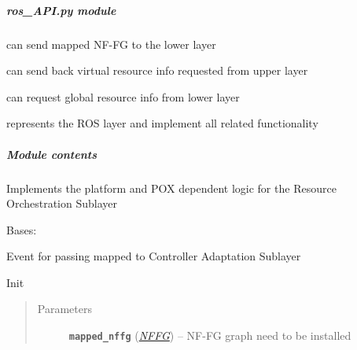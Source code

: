 \documentclass[letterpaper,10pt,english]{sphinxmanual}
\begin{document}
\subparagraph{\emph{ros\_API.py} module}
\label{orchest/ros_API:ros-api-py-module}\label{orchest/ros_API::doc}
{\hyperref[orchest/ros_API:escape.orchest.ros_API.InstallNFFGEvent]{\emph{}}} can send mapped NF-FG to the lower layer

{\hyperref[orchest/ros_API:escape.orchest.ros_API.VirtResInfoEvent]{\emph{}}} can send back virtual resource info requested from
upper layer

{\hyperref[orchest/ros_API:escape.orchest.ros_API.GetGlobalResInfoEvent]{\emph{}}} can request global resource info from lower layer

{\hyperref[orchest/ros_API:escape.orchest.ros_API.ResourceOrchestrationAPI]{\emph{}}} represents the ROS layer and implement all
related functionality


\subparagraph{Module contents}
\label{orchest/ros_API:module-contents}\label{orchest/ros_API:module-escape.orchest.ros_API}
Implements the platform and POX dependent logic for the Resource Orchestration
Sublayer

\begin{fulllineitems}
\label{orchest/ros_API:escape.orchest.ros_API.InstallNFFGEvent}
Bases: 

Event for passing mapped {\hyperref[util/nffg:escape.util.nffg.NFFG]{\emph{}}} to Controller
Adaptation Sublayer

\begin{fulllineitems}
\label{orchest/ros_API:escape.orchest.ros_API.InstallNFFGEvent.__init__}
Init
\begin{quote}\begin{description}
\item[{Parameters}] \leavevmode
\textbf{\texttt{mapped\_nffg}} ({\hyperref[util/nffg:escape.util.nffg.NFFG]{\emph{\emph{NFFG}}}}) -- NF-FG graph need to be installed

\end{description}\end{quote}

\end{fulllineitems}


\end{fulllineitems}
\end{document}
